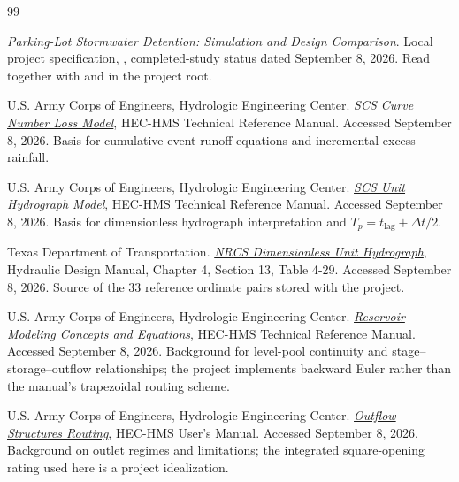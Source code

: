 \documentclass[11pt,letterpaper]{article}
\newcommand{\file}[1]{\texttt{\detokenize{#1}}}
\begin{document}
\clearpage
{}
{}
\begin{thebibliography}{99}
\small\raggedright
{}
\emph{Parking-Lot Stormwater Detention: Simulation and Design Comparison}.
Local project specification, \file{PROJECT_PLAN.md}, completed-study status
dated September 8, 2026. Read together with \file{README.md} and
\file{FINDINGS.md} in the project root.

U.S. Army Corps of Engineers, Hydrologic Engineering Center.
\href{https://www.hec.usace.army.mil/confluence/hmsdocs/hmstrm/canopy-surface-infiltration-and-runoff-volume/infiltration/scs-curve-number-loss-model}
{\emph{SCS Curve Number Loss Model}}, HEC-HMS Technical Reference Manual.
Accessed September 8, 2026. Basis for cumulative event runoff equations and
incremental excess rainfall.

U.S. Army Corps of Engineers, Hydrologic Engineering Center.
\href{https://www.hec.usace.army.mil/confluence/hmsdocs/hmstrm/transform/scs-unit-hydrograph-model}
{\emph{SCS Unit Hydrograph Model}}, HEC-HMS Technical Reference Manual.
Accessed September 8, 2026. Basis for dimensionless hydrograph interpretation
and $T_p=t_{\mathrm{lag}}+\Delta t/2$.

Texas Department of Transportation.
\href{https://www.txdot.gov/manuals/des/hyd/chapter-4--hydrology/section-13--hydrograph-method/nrcs-dimensionless-unit-hydrograph.html}
{\emph{NRCS Dimensionless Unit Hydrograph}}, Hydraulic Design Manual,
Chapter 4, Section 13, Table 4-29. Accessed September 8, 2026.
Source of the 33 reference ordinate pairs stored with the project.

U.S. Army Corps of Engineers, Hydrologic Engineering Center.
\href{https://www.hec.usace.army.mil/confluence/hmsdocs/hmstrm/reservoir-modeling/reservoir-modeling-concepts-and-equations}
{\emph{Reservoir Modeling Concepts and Equations}}, HEC-HMS Technical
Reference Manual. Accessed September 8, 2026. Background for level-pool
continuity and stage--storage--outflow relationships; the project implements
backward Euler rather than the manual's trapezoidal routing scheme.

U.S. Army Corps of Engineers, Hydrologic Engineering Center.
\href{https://www.hec.usace.army.mil/confluence/hmsdocs/hmsum/latest/reservoir-elements/outflow-structures-routing}
{\emph{Outflow Structures Routing}}, HEC-HMS User's Manual.
Accessed September 8, 2026. Background on outlet regimes and limitations;
the integrated square-opening rating used here is a project idealization.


\end{thebibliography}
\end{document}
